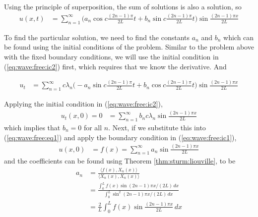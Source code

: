 Using the principle of superposition, the sum of solutions is also a solution, so 
%
\begin{align} \label{eq:wave:free:eq1}
u(x,t) & = \sum_{n=1}^{\infty} \biggl(a_n \cos c \frac{(2n-1)\pi}{2L} t + b_n \sin c \frac{(2n-1)\pi}{2L} t \biggr) \sin \frac{(2n-1)\pi x}{2L}
\end{align}

To find the particular solution, we need to find the constants $a_n$ and $b_n$ which can be found using the initial conditions of the problem.  Similar to the problem above with the fixed boundary conditions, we will use the initial condition in (\ref{eq:wave:free:ic2}) first, which requires that we know the derivative.  And

\begin{align*}
u_t & = \sum_{n=1}^{\infty} c \lambda_n \biggl(-a_n \sin c \frac{(2n-1)\pi}{2L} t + b_n \cos c \frac{(2n-1)\pi}{2L} t \biggr) \sin \frac{(2n-1)\pi x}{2L}
\end{align*}

Applying the initial condition in (\ref{eq:wave:free:ic2}), 
\begin{align*}
u_t(x,0)=0 & = \sum_{n=1}^{\infty}b_n c \lambda_n  \sin \frac{(2n-1)\pi x}{2L}
\end{align*}
which implies that $b_n=0$ for all $n$.  Next, if we substitute this into (\ref{eq:wave:free:eq1}) and apply the boundary condition in (\ref{eq:wave:free:ic1}), 
%
\begin{align*}
u(x,0) & = f(x) = \sum_{n=1}^{\infty} a_n \sin \frac{(2n-1)\pi x}{2L}
\end{align*}
and the coefficients can be found using Theorem \ref{thm:sturm:liouville}, to be 
%
\begin{align*}
a_n & = \frac{\langle f(x), X_n(x) \rangle}{\langle X_n(x), X_n(x) \rangle} \\
& = \frac{\int_0^L f(x) \sin (2n-1)\pi x/(2L) \, dx }{\int_0^L \sin^2 (2n-1)\pi x/(2L) \, dx } \\
& = \frac{2}{L} \int_0^L f(x) \sin  \frac{(2n-1)\pi x}{2L} \, dx 
\end{align*}

